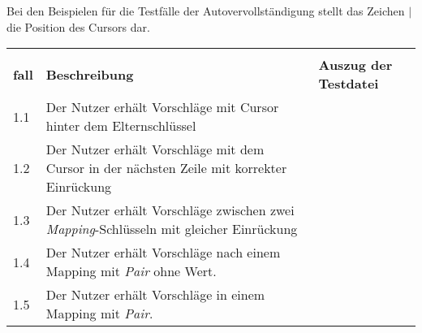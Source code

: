 Bei den Beispielen für die Testfälle der Autovervollständigung stellt das Zeichen $|$ die Position des Cursors dar.

\begin{table}[htp]
  \centering
  \begin{tabularx}{\columnwidth}{lXl}
    \toprule
    \begin{tabular}{@{}l@{}}\textbf{Test-} \\ \textbf{fall} \end{tabular} & \textbf{Beschreibung}                                                                                                                                                                                                                 & \textbf{Auszug der Testdatei}             \\
    \midrule
    1.1                                                                   & Der Nutzer erhält Vorschläge mit Cursor hinter dem Elternschlüssel                                                                                                                                                                    &  \\
    \midrule
    1.2                                                                   & Der Nutzer erhält Vorschläge mit dem Cursor in der nächsten Zeile mit korrekter Einrückung                                                                                                                                            &  \\
    \midrule
    1.3                                                                   & Der Nutzer erhält Vorschläge zwischen zwei \textit{Mapping}-Schlüsseln mit gleicher Einrückung                                                                                                                                        &  \\
    \midrule
    1.4                                                                   & Der Nutzer erhält Vorschläge nach einem Mapping mit \textit{Pair} ohne Wert.                                                                                                                                                          &  \\
    \midrule
    1.5                                                                   & Der Nutzer erhält Vorschläge in einem Mapping mit \textit{Pair}.                                                                                                                                                                      &                                           \\

\end{tabularx}
\end{table}
